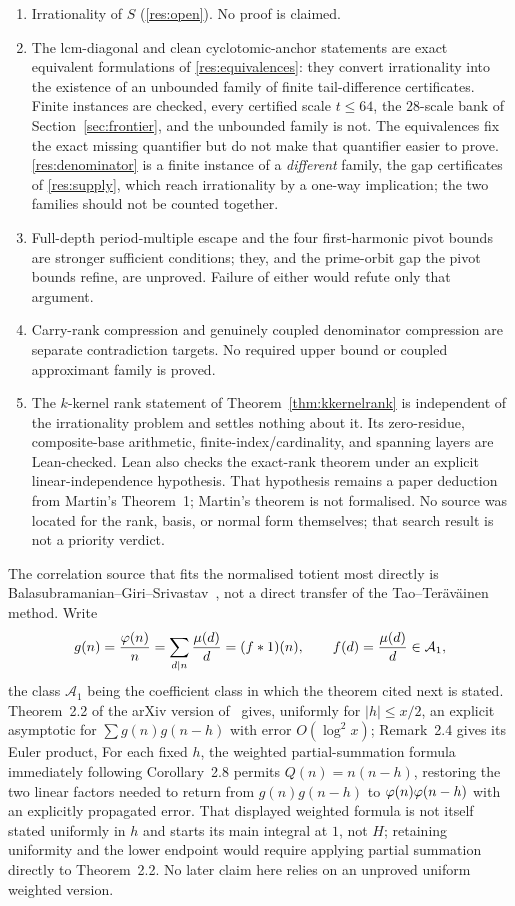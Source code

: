 \documentclass[11pt]{article}
\newcommand{\Stot}{S}
\begin{document}
\begin{enumerate}
\item Irrationality of $\Stot$ (\ref{res:open}).  No proof is claimed.
\item The lcm-diagonal and clean cyclotomic-anchor statements are exact
  equivalent formulations of \ref{res:equivalences}: they convert
  irrationality into the existence of an unbounded family of finite
  tail-difference certificates.  Finite instances are checked, every
  certified scale $t\le64$, the $28$-scale bank of
  Section~\ref{sec:frontier}, and the unbounded family is not.  The
  equivalences fix the exact missing quantifier but do not make that
  quantifier easier to prove.  \ref{res:denominator} is a finite instance of a
  \emph{different} family, the gap certificates of \ref{res:supply}, which
  reach irrationality by a one-way implication; the two families should not be
  counted together.
\item Full-depth period-multiple escape and the four first-harmonic pivot
  bounds are stronger sufficient conditions; they, and the prime-orbit gap the
  pivot bounds refine, are unproved.  Failure of either would refute only that
  argument.
\item Carry-rank compression and genuinely coupled denominator compression
  are separate contradiction targets.  No required upper bound or coupled
  approximant family is proved.
\item The $k$-kernel rank statement of Theorem~\ref{thm:kkernelrank} is
  independent of the irrationality problem and settles nothing about it.  Its
  zero-residue, composite-base arithmetic, finite-index/cardinality, and
  spanning layers are Lean-checked.  Lean also checks the exact-rank theorem
  under an explicit linear-independence hypothesis.  That hypothesis remains
  a paper deduction from Martin's Theorem~1; Martin's theorem is not
  formalised.  No source was located for the rank, basis, or normal form
  themselves; that search result is not a priority verdict.
\end{enumerate}

\noindent The correlation source that fits the normalised totient most
directly is Balasubramanian--Giri--Srivastav~\cite{bgs2017}, not a direct
transfer of the Tao--Ter\"av\"ainen method.  Write
\[
  g(n)=\frac{\varphi(n)}n
      =\sum_{d\mid n}\frac{\mu(d)}d=(f*1)(n),
  \qquad f(d)=\frac{\mu(d)}d\in\mathcal A_1 ,
\]
the class $\mathcal A_1$ being the coefficient class in which the theorem
cited next is stated.
Theorem~2.2 of the arXiv version of~\cite{bgs2017} gives, uniformly for
$|h|\le x/2$, an explicit asymptotic for
$\sum g(n)g(n-h)$ with error $O(\log^2x)$; Remark~2.4 gives its Euler product,
For each fixed $h$, the weighted partial-summation formula immediately
following Corollary~2.8 permits $Q(n)=n(n-h)$, restoring the two linear
factors needed to return from $g(n)g(n-h)$ to
$\varphi(n)\varphi(n-h)$ with an explicitly propagated error.  That displayed
weighted formula is not itself stated uniformly in $h$ and starts its main
integral at \(1\), not \(H\); retaining uniformity and the lower endpoint
would require applying partial summation directly to Theorem~2.2.  No later
claim here relies on an unproved uniform weighted version.
\end{document}

